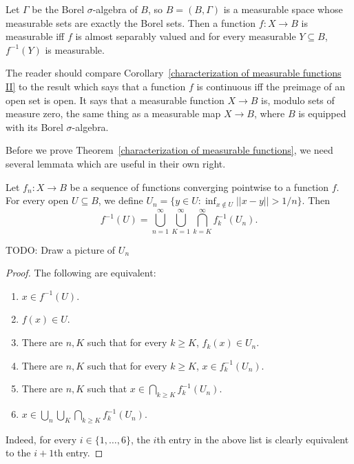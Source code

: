 \begin{corollary}
\label{characterization of measurable functions II}
Let $\Gamma$ be the Borel $\sigma$-algebra of $B$, so $B = (B, \Gamma)$ is a measurable space whose measurable sets are exactly the Borel sets.
Then a function $f: X \to B$ is measurable iff $f$ is almost separably valued and for every measurable $Y \subseteq B$, $f^{-1}(Y)$ is measurable.
\end{corollary}

\begin{subsec}
The reader should compare Corollary~\ref{characterization of measurable functions II} to the result which says that a function $f$ is continuous iff the preimage of an open set is open. It says that a measurable function $X \to B$ is, modulo sets of measure zero, the same thing as a measurable map $X \to B$, where $B$ is equipped with its Borel $\sigma$-algebra.
\end{subsec}

\begin{subsec}
Before we prove Theorem~\ref{characterization of measurable functions}, we need several lemmata which are useful in their own right.
\end{subsec}

\begin{lemma}
\label{Newberger lemma 1}
Let $f_{n}: X \to B$ be a sequence of functions converging pointwise to a function $f$.
For every open $U \subseteq B$, we define $U_{n} = \{y \in U: \inf_{x \notin U} ||x - y|| > 1/n\}$.
Then
\[f^{-1}(U) = \bigcup_{n=1}^{\infty} \bigcup_{K=1}^{\infty} \bigcap_{k=K}^{\infty} f_{k}^{-1}(U_{n}).\]
\end{lemma}
TODO: Draw a picture of $U_{n}$
\begin{proof}
The following are equivalent:
\begin{enumerate}
\item $x \in f^{-1}(U)$.
\item $f(x) \in U$.
\item There are $n, K$ such that for every $k \geq K$, $f_{k}(x) \in U_{n}$.
\item There are $n, K$ such that for every $k \geq K$, $x \in f_{k}^{-1}(U_{n})$.
\item There are $n, K$ such that $x \in \bigcap_{k \geq K} f_{k}^{-1}(U_{n})$.
\item $x \in \bigcup_{n} \bigcup_{K} \bigcap_{k \geq K} f_{k}^{-1}(U_{n})$.
\end{enumerate}
Indeed, for every $i \in \{1, \dots, 6\}$, the $i$th entry in the above list is clearly equivalent to the $i+1$th entry.
\end{proof}

